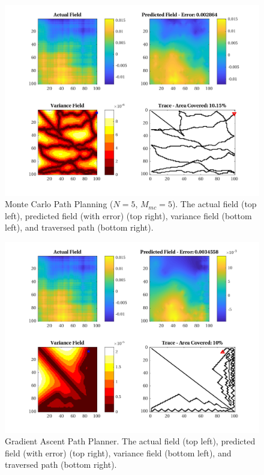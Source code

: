 \begin{figure}[htb!]
    \centering
    \includegraphics[width=0.8\linewidth]{figures/sim_figures/mc_10p_100x100_sf_50_seed_2}
    \captionsetup{skip=0.25\baselineskip}
    \ssp
    \caption{Monte Carlo Path Planning ($N=5$, $M_{mc}=5$). The actual field (top left), predicted field (with error) (top right), variance field (bottom left), and traversed path (bottom right).}
\end{figure}

\begin{figure}[htb!]
    \centering
    \includegraphics[width=0.8\linewidth]{figures/sim_figures/gradient_10p_100x100_sf_50_seed_2}
    \captionsetup{skip=0.25\baselineskip}
    \ssp
    \caption{Gradient Ascent Path Planner. The actual field (top left), predicted field (with error) (top right), variance field (bottom left), and traversed path (bottom right).}
\end{figure}

